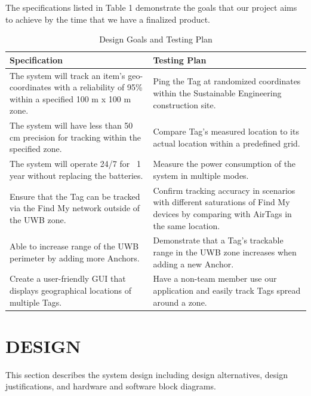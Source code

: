 \documentclass[conference]{IEEEtran}
\begin{document}
The specifications listed in Table 1 demonstrate the goals that our project 
aims to achieve by the time that we have a finalized product.
\begin{center}
\begin{table}
\caption{Design Goals and Testing Plan}
\begin{tabular}{|p{4cm}|p{4cm}|}
    \hline
    \textbf{Specification}  & \textbf{Testing Plan}\\
    \hline
    The system will track an item’s geo-coordinates with a reliability of 
    95\% within a specified 100 m x 100 m zone. 
    &
    Ping the Tag at randomized coordinates within the Sustainable 
    Engineering construction site.\\
    \hline
    The system will have less than 50 cm precision for tracking within 
    the specified zone.
    &
    Compare Tag’s measured location to its actual location 
    within a predefined grid.\\
    \hline
    The system will operate 24/7 for ~1 year without 
    replacing the batteries.
    &
    Measure the power consumption of the system in multiple modes.\\
    \hline
    Ensure that the Tag can be tracked via the Find My network outside 
    of the UWB zone.
    &
    Confirm tracking accuracy in scenarios with different saturations 
    of Find My devices by comparing with AirTags in the same location.\\
    \hline
    Able to increase range of the UWB perimeter by adding more Anchors.
    &
    Demonstrate that a Tag’s trackable range in the UWB zone increases 
    when adding a new Anchor.\\
    \hline
    Create a user-friendly GUI that displays geographical locations of multiple Tags.
    &
    Have a non-team member use our application and easily track Tags spread around a zone.\\
    \hline
\end{tabular}
\end{table}
\end{center}


\section{DESIGN}

This section describes the system design including design alternatives, 
design justifications, and hardware and software block diagrams.
\end{document}
